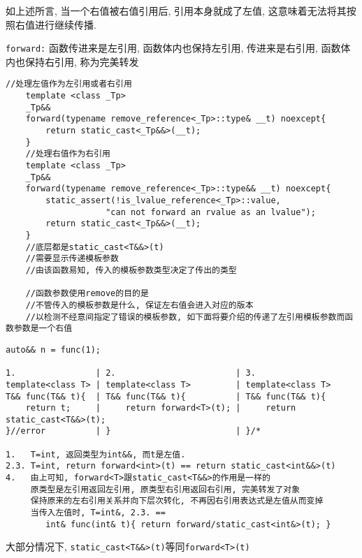 如上述所言, 当一个右值被右值引用后, 引用本身就成了左值, 这意味着无法将其按照右值进行继续传播.

{\tt forward:} 函数传进来是左引用, 函数体内也保持左引用, 传进来是右引用, 函数体内也保持右引用, 称为完美转发

\begin{lstlisting}[xleftmargin=2em,xrightmargin=2em,title={\tt forward}]
	//处理左值作为左引用或者右引用
	template <class _Tp>
	_Tp&&
	forward(typename remove_reference<_Tp>::type& __t) noexcept{
		return static_cast<_Tp&&>(__t);
	}
	//处理右值作为右引用
	template <class _Tp>
	_Tp&&
	forward(typename remove_reference<_Tp>::type&& __t) noexcept{
		static_assert(!is_lvalue_reference<_Tp>::value,
					"can not forward an rvalue as an lvalue");
		return static_cast<_Tp&&>(__t);
	}
	//底层都是static_cast<T&&>(t)
	//需要显示传递模板参数
	//由该函数易知, 传入的模板参数类型决定了传出的类型

	//函数参数使用remove的目的是
	//不管传入的模板参数是什么, 保证左右值会进入对应的版本
	//以检测不经意间指定了错误的模板参数, 如下面将要介绍的传递了左引用模板参数而函数参数是一个右值
\end{lstlisting}

\begin{lstlisting}[title=具体场景]
auto&& n = func(1);

1.				  |	2.						  | 3.
template<class T> |	template<class T>		  |	template<class T>
T&& func(T&& t){  |	T&& func(T&& t){		  |	T&& func(T&& t){
	return t;	  |		return forward<T>(t); |		return static_cast<T&&>(t);
}//error		  |	}						  |	}/*
			
1.   T=int, 返回类型为int&&, 而t是左值.  
2.3. T=int, return forward<int>(t) == return static_cast<int&&>(t)
4.   由上可知, forward<T>跟static_cast<T&&>的作用是一样的
	 原类型是左引用返回左引用, 原类型右引用返回右引用, 完美转发了对象
	 保持原来的左右引用关系并向下层次转化, 不再因右引用表达式是左值从而变掉
	 当传入左值时, T=int&, 2.3. ==
	 	int& func(int& t){ return forward/static_cast<int&>(t); }
\end{lstlisting}

大部分情况下, {\tt static\_cast<T\&\&>(t)}等同{\tt forward<T>(t)}

